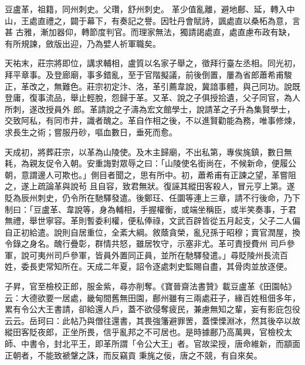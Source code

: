 
\begin{pinyinscope}
豆盧革，祖籍，同州刺史。父瓚，舒州刺史。
 革少值亂離，避地鄜、延，轉入中山，王處直禮之，闢于幕下，有奏記之譽。因牡丹會賦詩，諷處直以桑柘為意，言甚
 古雅，漸加器仰，轉節度判官。而理家無法，獨請謁處直，處直慮布政有缺，有所規諫，斂版出迎，乃為嬖人祈軍職矣。



 天祐末，莊宗將即位，講求輔相，盧質以名家子舉之，徵拜行臺左丞相。同光初，拜平章事。及登廊廟，事多錯亂，至于官階擬議，前後倒置，屢為省郎蕭希甫駿正，革改之，無難色。莊宗初定汴、洛，革引薦韋說，冀諳事體，與己同功。說既登庸，復事流品，舉止輕脫，怨歸于革。又革、說之子俱授拾遺，父子同官，為人所刺，遂改授員外
 郎。革請說之子濤為宏文館學士，說請革之子升為集賢學士，交致阿私，有同市井，識者醜之。革自作相之後，不以進賢勸能為務，唯事修煉，求長生之術；嘗服丹砂，嘔血數日，垂死而愈。



 天成初，將葬莊宗，以革為山陵使。及木主歸廟，不出私第，專俟旄鎮，數日無耗，為親友促令入朝。安重誨對眾辱之曰：「山陵使名銜尚在，不候新命，便履公朝，意謂邊人可欺也。」側目者聞之，思有所中。初，蕭希甫有正諫之望，革嘗阻之，遂上疏論革與說茍
 且自容，致君無狀。復誣其縱田客殺人，冒元亨上第。遂貶為辰州刺史，仍令所在馳驛發遣。後鄭玨、任圜等連上三章，請不行後命，乃下制曰：「豆盧革、韋說等，身為輔相，手握權衡，或端坐稱臣，或半笑奏事，于君無禮，舉世寧容。革則暫委利權，便私俸祿，文武百辟皆從五月起支，父子二人偏自正初給遣。說則自居重位，全紊大綱。敘蔭貪榮，亂兒孫于昭穆；賣官潤屋，換令錄之身名。醜行疊彰，群情共怒，雖居牧守，示塞非尤。革可責授費州
 司戶參軍，說可夷州司戶參軍，皆員外置同正員，並所在馳驛發遣。」尋貶陵州長流百姓，委長吏常知所在。天成二年夏，詔令逐處刺史監賜自盡，其骨肉並放逐便。



 子昇，官至檢校正郎，服金紫，尋亦削奪。《寶晉齋法書贊》載豆盧革《田園帖》云：大德欲要一居處，畿甸間舊無田園，鄜州雖有三兩處莊子，緣百姓租佃多年，累有令公大王書請，卻給還人戶，蓋不欲侵奪疲民，兼慮無知之輩，妄有影庇包役云云。岳珂曰：此帖乃與僧往還書，其畏強籓避罪罟，蓋慄慄淵冰，然其後卒以故縱田客貶夜郎，正坐所畏，信乎亂邦之不可居也。是時據鄜乃高萬興，官檢校太師、中書令，封北平王，即革所謂「令公大王」者。官故梁授，唐命維新，而顓面正朝者，不能致褫鞶之誅，而反竊貢
 秉旄之佞，唐之不競，有自來矣。




\end{pinyinscope}
